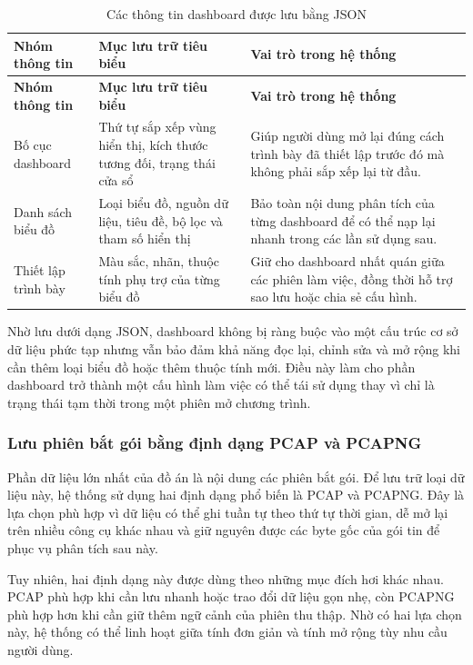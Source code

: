 \documentclass[../DoAn.tex]{subfiles}
\begin{document}
\begin{longtable}{|p{3.5cm}|p{4.2cm}|p{5.5cm}|}
\caption{Các thông tin dashboard được lưu bằng JSON} \label{tab:schema_dashboard_json} \\
\hline
\textbf{Nhóm thông tin} & \textbf{Mục lưu trữ tiêu biểu} & \textbf{Vai trò trong hệ thống} \\ \hline
\endfirsthead
\hline
\textbf{Nhóm thông tin} & \textbf{Mục lưu trữ tiêu biểu} & \textbf{Vai trò trong hệ thống} \\ \hline
\endhead
\hline
\endfoot
\hline
\endlastfoot
Bố cục dashboard & Thứ tự sắp xếp vùng hiển thị, kích thước tương đối, trạng thái cửa sổ & Giúp người dùng mở lại đúng cách trình bày đã thiết lập trước đó mà không phải sắp xếp lại từ đầu. \\ \hline
Danh sách biểu đồ & Loại biểu đồ, nguồn dữ liệu, tiêu đề, bộ lọc và tham số hiển thị & Bảo toàn nội dung phân tích của từng dashboard để có thể nạp lại nhanh trong các lần sử dụng sau. \\ \hline
Thiết lập trình bày & Màu sắc, nhãn, thuộc tính phụ trợ của từng biểu đồ & Giữ cho dashboard nhất quán giữa các phiên làm việc, đồng thời hỗ trợ sao lưu hoặc chia sẻ cấu hình. \\ \hline
\end{longtable}

Nhờ lưu dưới dạng JSON, dashboard không bị ràng buộc vào một cấu trúc cơ sở dữ liệu phức tạp nhưng vẫn bảo đảm khả năng đọc lại, chỉnh sửa và mở rộng khi cần thêm loại biểu đồ hoặc thêm thuộc tính mới. Điều này làm cho phần dashboard trở thành một cấu hình làm việc có thể tái sử dụng thay vì chỉ là trạng thái tạm thời trong một phiên mở chương trình.

\subsubsection{Lưu phiên bắt gói bằng định dạng PCAP và PCAPNG}
Phần dữ liệu lớn nhất của đồ án là nội dung các phiên bắt gói. Để lưu trữ loại dữ liệu này, hệ thống sử dụng hai định dạng phổ biến là PCAP và PCAPNG. Đây là lựa chọn phù hợp vì dữ liệu có thể ghi tuần tự theo thứ tự thời gian, dễ mở lại trên nhiều công cụ khác nhau và giữ nguyên được các byte gốc của gói tin để phục vụ phân tích sau này.

Tuy nhiên, hai định dạng này được dùng theo những mục đích hơi khác nhau. PCAP phù hợp khi cần lưu nhanh hoặc trao đổi dữ liệu gọn nhẹ, còn PCAPNG phù hợp hơn khi cần giữ thêm ngữ cảnh của phiên thu thập. Nhờ có hai lựa chọn này, hệ thống có thể linh hoạt giữa tính đơn giản và tính mở rộng tùy nhu cầu người dùng.
\end{document}
